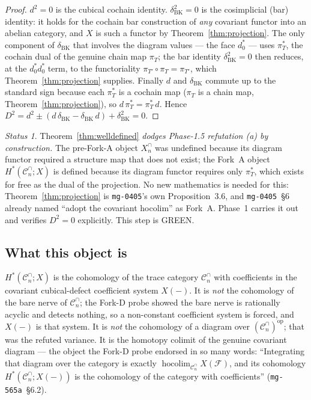 \documentclass[11pt,oneside]{amsart}
\theoremstyle{plain}
\theoremstyle{definition}
\theoremstyle{remark}
\theoremstyle{honeststyle}
\newtheorem{status}[theorem]{Status}
\newcommand{\F}{\mathcal{F}}
\newcommand{\Cn}{\mathcal{C}^{\cap}_n}
\newcommand{\hocolim}{\operatorname*{hocolim}}
\newcommand{\BK}{\mathrm{BK}}
\begin{document}
\begin{proof}
$d^2=0$ is the cubical cochain identity. $\delta_{\BK}^{2}=0$ is the
cosimplicial (bar) identity: it holds for the cochain bar construction
of \emph{any} covariant functor into an abelian category, and $X$ is
such a functor by Theorem~\ref{thm:projection}. The only component of
$\delta_{\BK}$ that involves the diagram values --- the face $d_0^{*}$
--- uses $\pi_{T}^{*}$, the cochain dual of the genuine chain map
$\pi_T$; the bar identity $\delta_{\BK}^2=0$ then reduces, at the
$d_0^{*}d_0^{*}$ term, to the functoriality
$\pi_{T'}\circ\pi_T=\pi_{T'}$, which Theorem~\ref{thm:projection}
supplies. Finally $d$ and $\delta_{\BK}$ commute up to the standard
sign because each $\pi_T^{*}$ is a cochain map ($\pi_T$ is a chain map,
Theorem~\ref{thm:projection}), so $d\,\pi_T^{*}=\pi_T^{*}\,d$. Hence
$D^2=d^2\pm(d\,\delta_{\BK}-\delta_{\BK}\,d)+\delta_{\BK}^2=0$.
\end{proof}

\begin{status}
\label{status:b-block}
Theorem~\ref{thm:welldefined} \emph{dodges Phase-1.5 refutation (a)
by construction.} The pre-Fork-A object $X^{\cap}_n$ was undefined
because its diagram functor required a structure map that does not
exist; the Fork~A object $H^{*}(\Cn;X)$ is defined because its
diagram functor requires only $\pi_T^{*}$, which exists for free as
the dual of the projection. No new mathematics is needed for this:
Theorem~\ref{thm:projection} is \texttt{mg-0405}'s own
Proposition~3.6, and \texttt{mg-0405}~\S6 already named ``adopt the
covariant hocolim'' as Fork~A. Phase~1 carries it out and verifies
$D^2=0$ explicitly. This step is \textsf{GREEN}.
\end{status}

\subsection{What this object is}
\label{ssec:what-it-is}

$H^{*}(\Cn;X)$ is the cohomology of the trace category $\Cn$ with
coefficients in the covariant cubical-defect coefficient system
$X(-)$. It is \emph{not} the cohomology of the bare nerve of $\Cn$;
the Fork-D probe showed the bare nerve is rationally acyclic and
detects nothing, so a non-constant coefficient system is forced, and
$X(-)$ is that system. It is \emph{not} the cohomology of a diagram
over $(\Cn)^{\mathrm{op}}$; that was the refuted variance. It is the
homotopy colimit of the genuine covariant diagram --- the object the
Fork-D probe endorsed in so many words: ``Integrating that diagram
over the category is exactly $\hocolim_{\Cn}X(\F)$, and its cohomology
$H^{*}(\Cn;X(-))$ is the cohomology of the category with coefficients''
(\texttt{mg-565a}~\S6.2).
\end{document}

